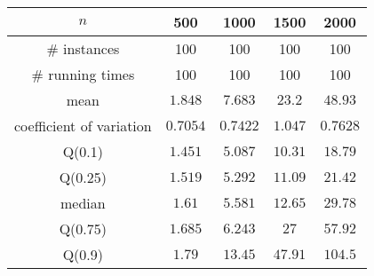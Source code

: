 \begin{tabular}{c|cccc} 
\hline 
$n$ & 500 & 1000 & 1500 & 2000 \tabularnewline 
\hline 
\# instances & 100 & 100 & 100 & 100 \tabularnewline 
\# running times & 100 & 100 & 100 & 100 \tabularnewline 
mean & $1.848$ & $7.683$ & $23.2$ & $48.93$ \tabularnewline 
coefficient of variation & $0.7054$ & $0.7422$ & $1.047$ & $0.7628$ \tabularnewline 
Q(0.1) & $1.451$ & $5.087$ & $10.31$ & $18.79$ \tabularnewline 
Q(0.25) & $1.519$ & $5.292$ & $11.09$ & $21.42$ \tabularnewline 
median & $1.61$ & $5.581$ & $12.65$ & $29.78$ \tabularnewline 
Q(0.75) & $1.685$ & $6.243$ & $27$ & $57.92$ \tabularnewline 
Q(0.9) & $1.79$ & $13.45$ & $47.91$ & $104.5$ \tabularnewline 
\hline 
\end{tabular} 
\medskip{} 

